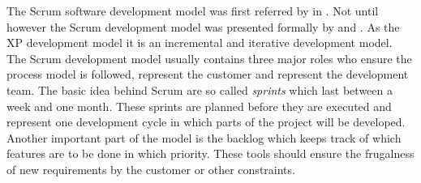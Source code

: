 The Scrum software development model was first referred by
\textcite{DeGrace1990} in \citeyear{DeGrace1990}. Not until
\citeyear{Sutherland1995} however the Scrum development model was presented
formally by \textcite{Sutherland1995} and \textcite{Schwaber1995}. As the
\acl{XP} development model it is an incremental and iterative development
model. The Scrum development model usually contains three major roles who
ensure the process model is followed, represent the customer and represent the
development team. The basic idea behind Scrum are so called \emph{sprints}
which last between a week and one month. These sprints are planned before they
are executed and represent one development cycle in which parts of the project
will be developed. Another important part of the model is the backlog which
keeps track of which features are to be done in which priority. These tools
should ensure the frugalness of new requirements by the customer or other
constraints.




